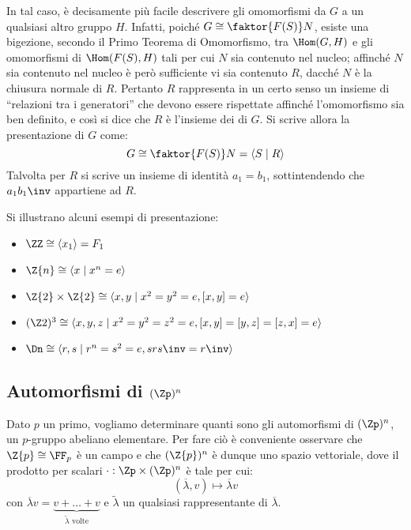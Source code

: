 \documentclass[11pt]{scrartcl}
\begin{document}
	
	In tal caso, è decisamente più facile descrivere gli
	omomorfismi da $G$ a un qualsiasi altro gruppo $H$.
	Infatti, poiché $G \cong \faktor{F(S)}N$, esiste una bigezione,
	secondo il Primo Teorema di Omomorfismo, tra
	$\Hom(G, H)$ e gli omomorfismi di $\Hom(F(S), H)$ tali
	per cui $N$ sia contenuto nel nucleo; affinché $N$
	sia contenuto nel nucleo è però sufficiente
	vi sia contenuto $R$, dacché $N$ è la chiusura normale
	di $R$. Pertanto $R$ rappresenta in un certo senso un
	insieme di ``relazioni tra i generatori'' che devono
	essere rispettate affinché l'omomorfismo sia ben definito, e
	così si dice che $R$ è l'insieme dei  di $G$.
	Si scrive allora la presentazione di $G$ come:
	\[ G \cong \faktor{F(S)}N = \langle S \mid R \rangle \]
	Talvolta per $R$ si scrive un insieme di identità
	$a_1 = b_1$, sottintendendo che
	$a_1 b_1\inv$ appartiene ad $R$.
	
	\begin{example}
		Si illustrano alcuni esempi di presentazione:
		
		\begin{itemize}
			\item $\ZZ \cong \langle x_1 \rangle = F_1$
			\item $\Z{n} \cong \langle{x \mid x^n = e}\rangle$
			\item $\Z{2} \times \Z{2} \cong \langle{x, y \mid x^2 = y^2 = e, [x, y] = e}\rangle$
			\item $(\Z2)^3 \cong \langle x, y, z \mid x^2 = y^2 = z^2 = e, [x, y] = [y, z] = [z, x] = e \rangle$
			\item $\Dn \cong \langle{r, s \mid r^n = s^2 = e, srs\inv = r\inv}\rangle$
		\end{itemize}
	\end{example}
	
	\newpage
	
	\subsection{Automorfismi di \texorpdfstring{$(\Zp)^n$}{(ℤ/pℤ)ⁿ}}
	\label{sez1.2}
	
	Dato $p$ un primo, vogliamo determinare quanti sono gli automorfismi di 
	$(\Zp)^n$, un $p$-gruppo abeliano elementare. Per fare ciò è conveniente osservare che $\Z{p} \cong \FF_p$ è un campo e che
	$(\Z{p})^n$ è dunque uno spazio vettoriale, dove il prodotto per scalari $\cdot : \Zp\times (\Zp)^n$ è
	tale per cui:
	\[
	(\overline{\lambda}, v)\longmapsto \overline{\lambda}v
	\]
	con $\overline{\lambda}v = \underset{\tilde{\lambda}\text{ volte}}{\underbrace{v + \ldots + v}}$
	e $\tilde{\lambda}$ un qualsiasi rappresentante di $\overline{\lambda}$. \medskip
	
\end{document}
